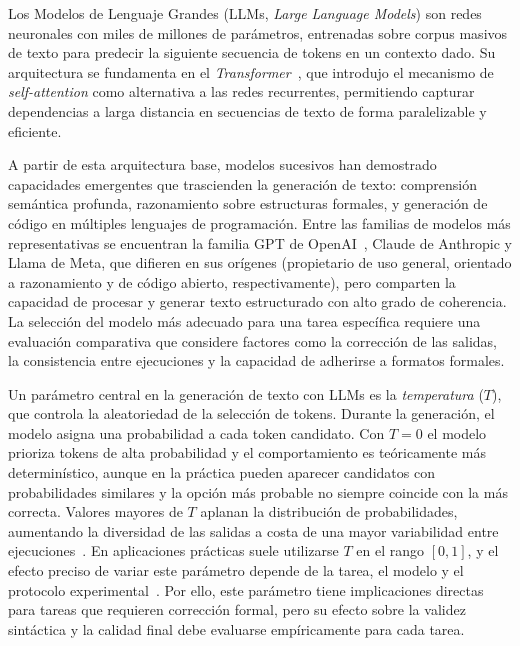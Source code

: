 Los Modelos de Lenguaje Grandes (LLMs, \textit{Large Language Models}) son redes neuronales con miles de millones de parámetros, entrenadas sobre corpus masivos de texto para predecir la siguiente secuencia de tokens en un contexto dado. Su arquitectura se fundamenta en el \textit{Transformer}~\cite{vaswani2017attention}, que introdujo el mecanismo de \textit{self-attention} como alternativa a las redes recurrentes, permitiendo capturar dependencias a larga distancia en secuencias de texto de forma paralelizable y eficiente.

A partir de esta arquitectura base, modelos sucesivos han demostrado capacidades emergentes que trascienden la generación de texto: comprensión semántica profunda, razonamiento sobre estructuras formales, y generación de código en múltiples lenguajes de programación. Entre las familias de modelos más representativas se encuentran la familia GPT de OpenAI~\cite{openai2023gpt4}, Claude de Anthropic y Llama de Meta, que difieren en sus orígenes (propietario de uso general, orientado a razonamiento y de código abierto, respectivamente), pero comparten la capacidad de procesar y generar texto estructurado con alto grado de coherencia. La selección del modelo más adecuado para una tarea específica requiere una evaluación comparativa que considere factores como la corrección de las salidas, la consistencia entre ejecuciones y la capacidad de adherirse a formatos formales.

Un parámetro central en la generación de texto con LLMs es la \textit{temperatura} ($T$), que controla la aleatoriedad de la selección de tokens. Durante la generación, el modelo asigna una probabilidad a cada token candidato. Con $T = 0$ el modelo prioriza tokens de alta probabilidad y el comportamiento es teóricamente más determinístico, aunque en la práctica pueden aparecer candidatos con probabilidades similares y la opción más probable no siempre coincide con la más correcta. Valores mayores de $T$ aplanan la distribución de probabilidades, aumentando la diversidad de las salidas a costa de una mayor variabilidad entre ejecuciones~\cite{holtzman2020degeneration}. En aplicaciones prácticas suele utilizarse $T$ en el rango $[0,1]$, y el efecto preciso de variar este parámetro depende de la tarea, el modelo y el protocolo experimental~\cite{renze2024temperature}. Por ello, este parámetro tiene implicaciones directas para tareas que requieren corrección formal, pero su efecto sobre la validez sintáctica y la calidad final debe evaluarse empíricamente para cada tarea.

